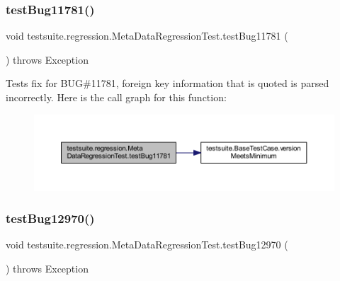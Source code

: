 \subsubsection{\texorpdfstring{test\+Bug11781()}{testBug11781()}}
{\footnotesize\ttfamily void testsuite.\+regression.\+Meta\+Data\+Regression\+Test.\+test\+Bug11781 (\begin{DoxyParamCaption}{ }\end{DoxyParamCaption}) throws Exception}

Tests fix for B\+UG\#11781, foreign key information that is quoted is parsed incorrectly. Here is the call graph for this function\+:
\nopagebreak
\begin{figure}[H]
\begin{center}
\leavevmode
\includegraphics[width=350pt]{classtestsuite_1_1regression_1_1_meta_data_regression_test_a3f114c46c9a6eba1998830d138edeaf5_cgraph}
\end{center}
\end{figure}
\mbox{\label{classtestsuite_1_1regression_1_1_meta_data_regression_test_a90992a3b409d173b89d677edbc407433}} 
\subsubsection{\texorpdfstring{test\+Bug12970()}{testBug12970()}}
{\footnotesize\ttfamily void testsuite.\+regression.\+Meta\+Data\+Regression\+Test.\+test\+Bug12970 (\begin{DoxyParamCaption}{ }\end{DoxyParamCaption}) throws Exception}

